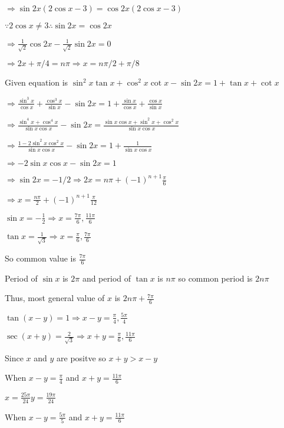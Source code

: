   $\Rightarrow \sin2x(2\cos x - 3) = \cos2x(2\cos x - 3)$

  $\because 2\cos x \neq 3 \therefore \sin 2x = \cos 2x$

  $\Rightarrow \frac{1}{\sqrt{2}}\cos2x - \frac{1}{\sqrt{2}}\sin2x = 0$

  $\Rightarrow 2x + \pi/4 = n\pi \Rightarrow x = n\pi/2 + \pi/8$

\item Given equation is $\sin^2x\tan x + \cos^2x\cot x - \sin 2x = 1 + \tan x + \cot x$

  $\Rightarrow \frac{\sin^3x}{\cos x} + \frac{\cos^3x}{\sin x} - \sin 2x = 1 + \frac{\sin x}{\cos x} + \frac{\cos x}{\sin
  x}$

  $\Rightarrow \frac{\sin^4x + \cos^4x}{\sin x\cos x} - \sin2x = \frac{\sin x\cos x + \sin^2x + \cos^2x}{\sin x\cos x}$

  $\Rightarrow \frac{1 - 2\sin^2x\cos^2x}{\sin x\cos x} - \sin2x = 1 + \frac{1}{\sin x\cos x}$

  $\Rightarrow -2\sin x\cos x - \sin 2x = 1$

  $\Rightarrow \sin 2x = -1/2 \Rightarrow 2x = n\pi + (-1)^{n + 1}\frac{\pi}{6}$

  $\Rightarrow x = \frac{n\pi}{2} + (-1)^{n + 1}\frac{\pi}{12}$

\item $\sin x = -\frac{1}{2} \Rightarrow x = \frac{7\pi}{6}, \frac{11\pi}{6}$

  $\tan x = \frac{1}{\sqrt{3}}\Rightarrow x = \frac{\pi}{6}, \frac{7\pi}{6}$

  So common value is $\frac{7\pi}{6}$

  Period of $\sin x$ is $2\pi$ and period of $\tan x$ is $n\pi$ so common period is $2n\pi$

  Thus, most general value of $x$ is $2n\pi +\frac{7\pi}{6}$

\item $\tan(x - y) = 1 \Rightarrow x - y = \frac{\pi}{4}, \frac{5\pi}{4}$

  $\sec(x + y) = \frac{2}{\sqrt{3}}\Rightarrow x + y = \frac{\pi}{6}, \frac{11\pi}{6}$

  Since $x$ and $y$ are positve so $x + y > x - y$

  When $x - y = \frac{\pi}{4}$ and $x + y = \frac{11\pi}{6}$

  $x = \frac{25\pi}{24} y = \frac{19\pi}{24}$

  When $x - y = \frac{5\pi}{5}$ and $x + y = \frac{11\pi}{6}$

